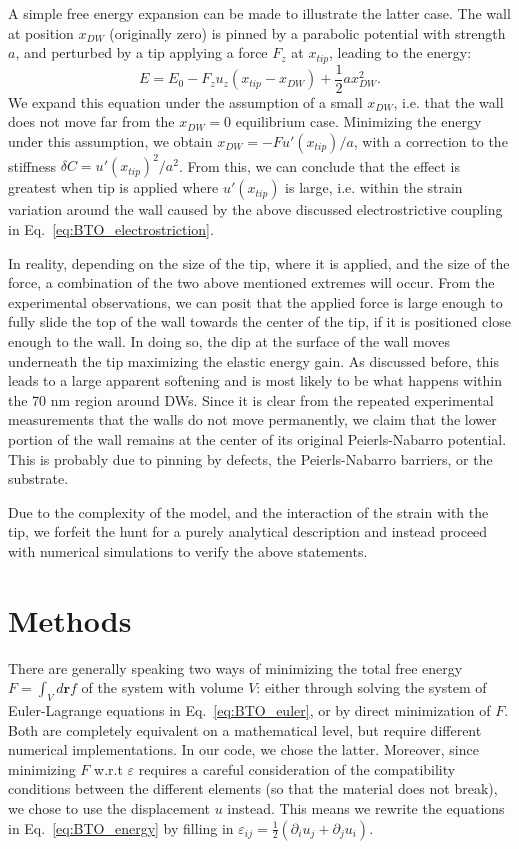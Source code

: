 A simple free energy expansion can be made to illustrate the latter case.
The wall at position $x_{DW}$ (originally zero) is pinned by a parabolic potential with strength $a$, and perturbed by a tip applying a force $F_z$ at $x_{tip}$, leading to the energy:
\begin{equation}
	E = E_0 - F_z u_z (x_{tip} - x_{DW}) + \frac{1}{2}a x_{DW}^2.
\end{equation}
We expand this equation under the assumption of a small $x_{DW}$, i.e. that the wall does not move far from the $x_{DW}=0$ equilibrium case.
Minimizing the energy under this assumption, we obtain $x_{DW} = -F u'(x_{tip})/a$, with a correction to the stiffness $\delta C = u'(x_{tip})^2/a^2$.
From this, we can conclude that the effect is greatest when tip is applied where $u'(x_{tip})$ is large, i.e. within the strain variation around the wall caused by the above discussed electrostrictive coupling in Eq.~\eqref{eq:BTO_electrostriction}.

In reality, depending on the size of the tip, where it is applied, and the size of the force, a combination of the two above mentioned extremes will occur.
From the experimental observations, we can posit that the applied force is large enough to fully slide the top of the wall towards the center of the tip, if it is positioned close enough to the wall.
In doing so, the dip at the surface of the wall moves underneath the tip maximizing the elastic energy gain.
As discussed before, this leads to a large apparent softening and is most likely to be what happens within the 70 nm region around DWs.
Since it is clear from the repeated experimental measurements that the walls do not move permanently, we claim that the lower portion of the wall remains at the center of its original Peierls-Nabarro potential.
This is probably due to pinning by defects, the Peierls-Nabarro barriers, or the substrate.

Due to the complexity of the model, and the interaction of the strain with the tip, we forfeit the hunt for a purely analytical description and instead proceed with numerical simulations to verify the above statements.

\section{Methods}
There are generally speaking two ways of minimizing the total free energy $F=\int_V d\bm{r} f$ of the system with volume $V$: either through solving the system of Euler-Lagrange equations in Eq.~\eqref{eq:BTO_euler}, or by direct minimization of $F$.
Both are completely equivalent on a mathematical level, but require different numerical implementations.
In our code, we chose the latter.
Moreover, since minimizing $F$ w.r.t $\varepsilon$ requires a careful consideration of the compatibility conditions between the different elements (so that the material does not break)\cite{Marton2007}, we chose to use the displacement $u$ instead.
This means we rewrite the equations in Eq.~\eqref{eq:BTO_energy} by filling in $\varepsilon_{ij} = \frac{1}{2}(\partial_i u_j + \partial_j u_i)$.

